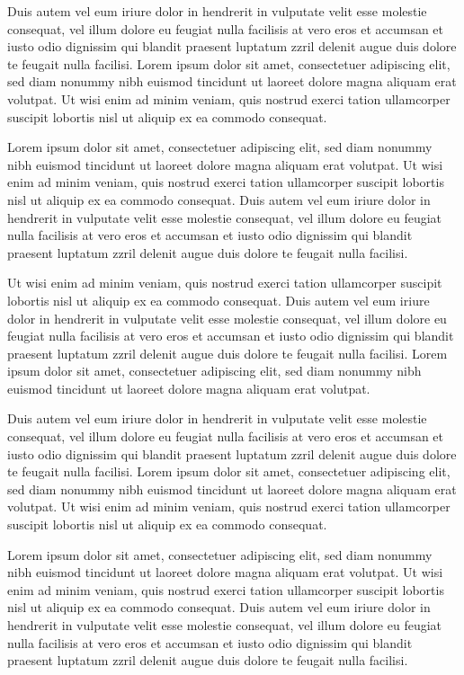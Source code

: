 \documentclass[oldfontcommands,6x9]{pupbook}
\begin{document}
Duis autem vel eum iriure dolor in hendrerit in vulputate velit esse
molestie consequat, vel illum dolore eu feugiat nulla facilisis at vero
eros et accumsan et iusto odio dignissim qui blandit praesent luptatum
zzril delenit augue duis dolore te feugait nulla facilisi. Lorem ipsum
dolor sit amet, consectetuer adipiscing elit, sed diam nonummy nibh
euismod tincidunt ut laoreet dolore magna aliquam erat volutpat. Ut wisi
enim ad minim veniam, quis nostrud exerci tation ullamcorper suscipit
lobortis nisl ut aliquip ex ea commodo consequat. 

Lorem ipsum dolor sit amet, consectetuer adipiscing elit, sed diam
nonummy nibh euismod tincidunt ut laoreet dolore magna aliquam erat
volutpat. Ut wisi enim ad minim veniam, quis nostrud exerci tation
ullamcorper suscipit lobortis nisl ut aliquip ex ea commodo consequat.
Duis autem vel eum iriure dolor in hendrerit in vulputate velit esse
molestie consequat, vel illum dolore eu feugiat nulla facilisis at vero
eros et accumsan et iusto odio dignissim qui blandit praesent luptatum
zzril delenit augue duis dolore te feugait nulla facilisi. 

Ut wisi enim ad minim veniam, quis nostrud exerci tation ullamcorper
suscipit lobortis nisl ut aliquip ex ea commodo consequat. Duis autem
vel eum iriure dolor in hendrerit in vulputate velit esse molestie
consequat, vel illum dolore eu feugiat nulla facilisis at vero eros et
accumsan et iusto odio dignissim qui blandit praesent luptatum zzril
delenit augue duis dolore te feugait nulla facilisi. Lorem ipsum dolor
sit amet, consectetuer adipiscing elit, sed diam nonummy nibh euismod
tincidunt ut laoreet dolore magna aliquam erat volutpat. 

Duis autem vel eum iriure dolor in hendrerit in vulputate velit esse
molestie consequat, vel illum dolore eu feugiat nulla facilisis at vero
eros et accumsan et iusto odio dignissim qui blandit praesent luptatum
zzril delenit augue duis dolore te feugait nulla facilisi. Lorem ipsum
dolor sit amet, consectetuer adipiscing elit, sed diam nonummy nibh
euismod tincidunt ut laoreet dolore magna aliquam erat volutpat. Ut wisi
enim ad minim veniam, quis nostrud exerci tation ullamcorper suscipit
lobortis nisl ut aliquip ex ea commodo consequat. 

Lorem ipsum dolor sit amet, consectetuer adipiscing elit, sed diam
nonummy nibh euismod tincidunt ut laoreet dolore magna aliquam erat
volutpat. Ut wisi enim ad minim veniam, quis nostrud exerci tation
ullamcorper suscipit lobortis nisl ut aliquip ex ea commodo consequat.
Duis autem vel eum iriure dolor in hendrerit in vulputate velit esse
molestie consequat, vel illum dolore eu feugiat nulla facilisis at vero
eros et accumsan et iusto odio dignissim qui blandit praesent luptatum
zzril delenit augue duis dolore te feugait nulla facilisi. 
\end{document}
